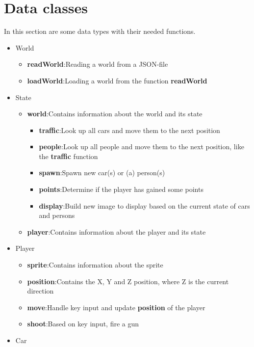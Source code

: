 \documentclass[12pt]{article}
\begin{document}
	\section{Data classes}
	In this section are some data types with their needed functions.
	\begin{itemize}
		\item World
			\begin{itemize}
				\item \textbf{readWorld}:\quad Reading a world from a JSON-file
				\item \textbf{loadWorld}:\quad Loading a world from the function \textbf{readWorld}
			\end{itemize}
		\item State
			\begin{itemize}
				\item \textbf{world}:\quad Contains information about the world and its state
					\begin{itemize}
						\item \textbf{traffic}:\quad Look up all cars and move them to the next position
						\item \textbf{people}:\quad Look up all people and move them to the next position, like the \textbf{traffic} function
						\item \textbf{spawn}:\quad Spawn new car(s) or (a) person(s)
						\item \textbf{points}:\quad Determine if the player has gained some points
						\item \textbf{display}:\quad Build new image to display based on the current state of cars and persons
					\end{itemize}
				\item \textbf{player}:\quad Contains information about the player and its state
			\end{itemize}
		\item Player
			\begin{itemize}
				\item \textbf{sprite}:\quad Contains information about the sprite
				\item \textbf{position}:\quad Contains the X, Y and Z position, where Z is the current direction
				\item \textbf{move}:\quad Handle key input and update \textbf{position} of the player
				\item \textbf{shoot}:\quad Based on key input, fire a gun
			\end{itemize}
		\item Car

\end{itemize}
\end{document}
